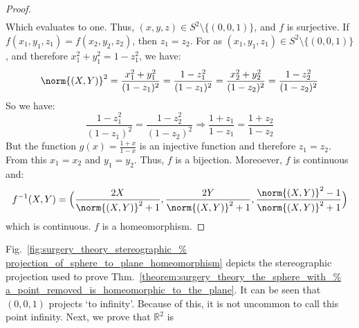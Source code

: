 \documentclass[crop=false,class=book,oneside]{standalone}
\begin{document}
\begin{proof}
\begin{subequations}
\begin{align}
                    \end{align}
                \end{subequations}
                Which evaluates to one. Thus, $(x,y,z)\in S^{2}\setminus\{(0,0,1)\}$,
                and $f$ is surjective. If $f(x_{1},y_{1},z_{1})=f(x_{2},y_{2},z_{2})$,
                then $z_{1}=z_{2}$. For as
                $(x_{1},y_{1},z_{1})\in S^{2}\setminus\{(0,0,1)\}$,
                and therefore $x_{1}^{2}+y_{1}^{2}=1-z_{1}^{2}$, we have:
                \begin{equation}
                    \norm{(X,Y)}^{2}
                    =\frac{x_{1}^2+y_{1}^2}{(1-z_{1})^{2}}
                    =\frac{1-z_{1}^{2}}{(1-z_{1})^{2}}
                    =\frac{x_{2}^{2}+y_{2}^{2}}{(1-z_{2})^{2}}
                    =\frac{1-z_{2}^{2}}{(1-z_{2})^{2}}
                \end{equation}
                So we have:
                \begin{equation}
                    \frac{1-z_{1}^{2}}{(1-z_{1})^{2}}
                    =\frac{1-z_{2}^{2}}{(1-z_{2})^{2}}
                    \Rightarrow
                    \frac{1+z_{1}}{1-z_{1}}
                    =\frac{1+z_{2}}{1-z_{2}}
                \end{equation}
                But the function $g(x)=\frac{1+x}{1-x}$
                is an injective function and therefore $z_{1}=z_{2}$.
                From this $x_{1}=x_{2}$ and $y_{1}=y_{2}$.
                Thus, $f$ is a bijection. Moreoever,
                $f$ is continuous and:
                \begin{equation}
                    f^{-1}(X,Y)
                    =\Big(\frac{2X}{\norm{(X,Y)}^{2}+1},
                      \frac{2Y}{\norm{(X,Y)}^{2}+1},
                      \frac{\norm{(X,Y)}^{2}-1}{\norm{(X,Y)}^{2}+1}\Big)
                \end{equation}
                which is continuous. $f$ is a homeomorphism.
            \end{proof}
            Fig.~\ref{fig:surgery_theory_stereographic_%
                      projection_of_sphere_to_plane_homeomorphism}
            depicts the stereographic projection used
            to prove Thm.~\ref{theorem:surgery_theory_the_sphere_with_%
                               a_point_removed_is_homeomorphic_to_the_plane}.
            It can be seen that $(0,0,1)$ projects `to infinity'.
            Because of this, it is not uncommon to call this point
            infinity. Next, we prove that $\mathbb{R}^{2}$ is
\end{document}
